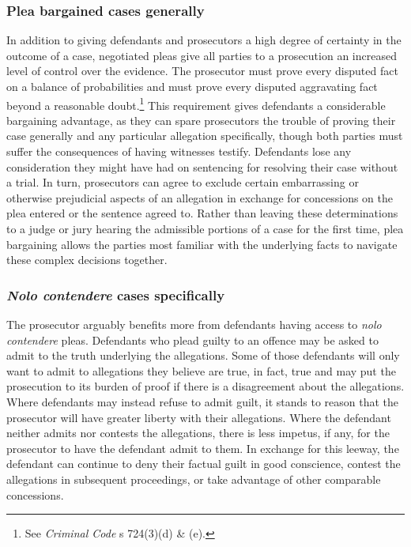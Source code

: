 \subsubsection{Plea bargained cases generally}

In addition to giving defendants and prosecutors a high degree of certainty in the outcome of a case, negotiated pleas give all parties to a prosecution an increased level of control over the evidence. The prosecutor must prove every disputed fact on a balance of probabilities and must prove every disputed aggravating fact beyond a reasonable doubt.\footnote{See \textit{Criminal Code} s 724(3)(d) \& (e).} This requirement gives defendants a considerable bargaining advantage, as they can spare prosecutors the trouble of proving their case generally and any particular allegation specifically, though both parties must suffer the consequences of having witnesses testify. Defendants lose any consideration they might have had on sentencing for resolving their case without a trial. In turn, prosecutors can agree to exclude certain embarrassing or otherwise prejudicial aspects of an allegation in exchange for concessions on the plea entered or the sentence agreed to.  Rather than leaving these determinations to a judge or jury hearing the admissible portions of a case for the first time, plea bargaining allows the parties most familiar with the underlying facts to navigate these complex decisions together.

\subsubsection{\textit{Nolo contendere} cases specifically}

The prosecutor arguably benefits more from defendants having access to \textit{nolo contendere} pleas. Defendants who plead guilty to an offence may be asked to admit to the truth underlying the allegations. Some of those defendants will only want to admit to allegations they believe are true, in fact, true and may put the prosecution to its burden of proof if there is a disagreement about the allegations. Where defendants may instead refuse to admit guilt, it stands to reason that the prosecutor will have greater liberty with their allegations. Where the defendant neither admits nor contests the allegations, there is less impetus, if any, for the prosecutor to have the defendant admit to them. In exchange for this leeway, the defendant can continue to deny their factual guilt in good conscience, contest the allegations in subsequent proceedings, or take advantage of other comparable concessions.

